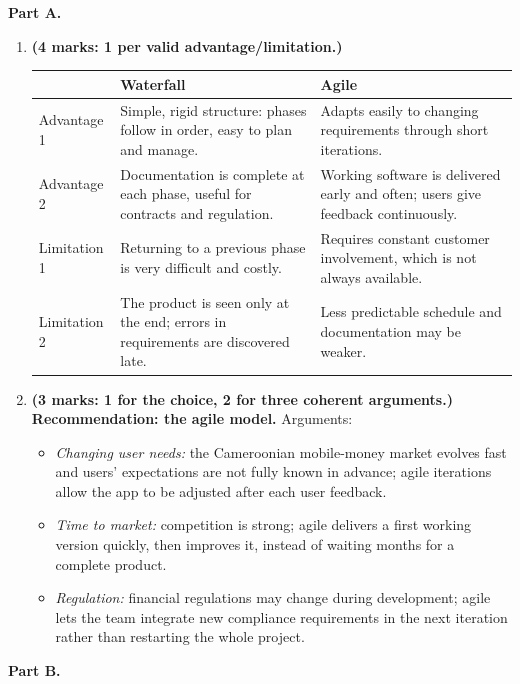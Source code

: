 \documentclass[11pt]{article}
\begin{document}
\begin{corrige}
\textbf{Part A.}
\begin{enumerate}
\item \textbf{(4 marks: 1 per valid advantage/limitation.)}
\begin{center}
\begin{tabularx}{\linewidth}{|l|X|X|}
\hline
\rowcolor{popblueL} & \textbf{Waterfall} & \textbf{Agile} \\
\hline
Advantage 1 & Simple, rigid structure: phases follow in order, easy to plan and manage. & Adapts easily to changing requirements through short iterations. \\
\hline
Advantage 2 & Documentation is complete at each phase, useful for contracts and regulation. & Working software is delivered early and often; users give feedback continuously. \\
\hline
Limitation 1 & Returning to a previous phase is very difficult and costly. & Requires constant customer involvement, which is not always available. \\
\hline
Limitation 2 & The product is seen only at the end; errors in requirements are discovered late. & Less predictable schedule and documentation may be weaker. \\
\hline
\end{tabularx}
\end{center}
\item \textbf{(3 marks: 1 for the choice, 2 for three coherent arguments.)}\\
\textbf{Recommendation: the agile model.} Arguments:
\begin{itemize}
\item \emph{Changing user needs:} the Cameroonian mobile-money market evolves fast and users' expectations are not fully known in advance; agile iterations allow the app to be adjusted after each user feedback.
\item \emph{Time to market:} competition is strong; agile delivers a first working version quickly, then improves it, instead of waiting months for a complete product.
\item \emph{Regulation:} financial regulations may change during development; agile lets the team integrate new compliance requirements in the next iteration rather than restarting the whole project.
\end{itemize}
\end{enumerate}
\textbf{Part B.}
\begin{enumerate}

\end{enumerate}
\end{corrige}
\end{document}
